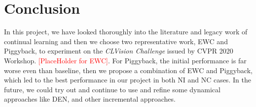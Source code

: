 \section{Conclusion}\label{conclusion}
In this project, we have looked thoroughly into the literature and legacy work of continual learning and then we choose two representative work, EWC and Piggyback, to experiment on the \textit{CLVision Challenge} issued by CVPR 2020 Workshop. \textcolor{red}{[PlaceHolder for EWC]}. For Piggyback, the initial performance is far worse even than baseline, then we propose a combination of EWC and Piggyback, which led to the best performance in our project in both NI and NC cases. In the future, we could try out and continue to use and refine some dynamical approaches like DEN, and other incremental approaches\cite{zhou2012online}. 